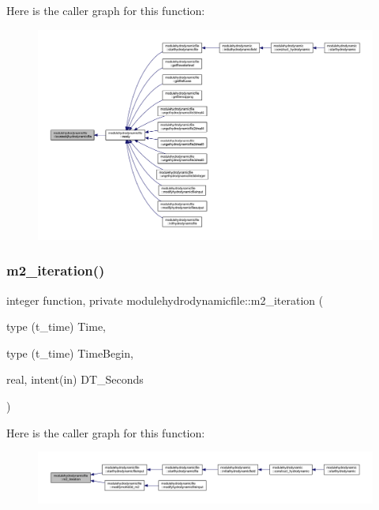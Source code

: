 Here is the caller graph for this function\+:\nopagebreak
\begin{figure}[H]
\begin{center}
\leavevmode
\includegraphics[width=350pt]{namespacemodulehydrodynamicfile_aa662fd4d0a1262940a320a6801dbe247_icgraph}
\end{center}
\end{figure}
\mbox{\label{namespacemodulehydrodynamicfile_a5a3a54142c84c39924e24d98da9014ae}} 
\subsubsection{\texorpdfstring{m2\+\_\+iteration()}{m2\_iteration()}}
{\footnotesize\ttfamily integer function, private modulehydrodynamicfile\+::m2\+\_\+iteration (\begin{DoxyParamCaption}\item[{type (t\+\_\+time)}]{Time,  }\item[{type (t\+\_\+time)}]{Time\+Begin,  }\item[{real, intent(in)}]{D\+T\+\_\+\+Seconds }\end{DoxyParamCaption})\hspace{0.3cm}{\ttfamily [private]}}

Here is the caller graph for this function\+:\nopagebreak
\begin{figure}[H]
\begin{center}
\leavevmode
\includegraphics[width=350pt]{namespacemodulehydrodynamicfile_a5a3a54142c84c39924e24d98da9014ae_icgraph}
\end{center}
\end{figure}
\mbox{\label{namespacemodulehydrodynamicfile_a78cdd03605613d9ae76372179d4bb493}} 

